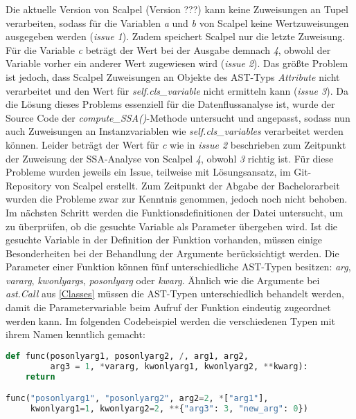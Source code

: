 \documentclass[german,bachelor]{swsLeipzig}
\begin{document}
Die aktuelle Version von Scalpel (Version ???) kann keine Zuweisungen an Tupel verarbeiten, sodass für die Variablen \textit{a} und \textit{b}
von Scalpel keine Wertzuweisungen ausgegeben werden (\textit{issue 1}).
Zudem speichert Scalpel nur die letzte Zuweisung.
Für die Variable \textit{c} beträgt der Wert bei der Ausgabe demnach \textit{4}, obwohl der Variable vorher ein anderer
Wert zugewiesen wird (\textit{issue 2}).
Das größte Problem ist jedoch, dass Scalpel Zuweisungen an Objekte des AST-Typs \textit{Attribute} nicht verarbeitet
und den Wert für \textit{self.cls\_variable} nicht ermitteln kann (\textit{issue 3}).
Da die Lösung dieses Problems essenziell für die Datenflussanalyse ist, wurde der Source Code der \textit{compute\_SSA()}-Methode
untersucht und angepasst, sodass nun auch Zuweisungen an Instanzvariablen wie \textit{self.cls\_variables} verarbeitet werden können.
Leider beträgt der Wert für \textit{c} wie in \textit{issue 2} beschrieben zum Zeitpunkt der Zuweisung der SSA-Analyse von Scalpel \textit{4}, obwohl
\textit{3} richtig ist.
Für diese Probleme wurden jeweils ein Issue, teilweise mit Lösungsansatz, im Git-Repository von Scalpel erstellt.
Zum Zeitpunkt der Abgabe der Bachelorarbeit wurden die Probleme zwar zur Kenntnis genommen, jedoch noch nicht behoben.\\

Im nächsten Schritt werden die Funktionsdefinitionen der Datei untersucht, um zu überprüfen, ob die gesuchte Variable als
Parameter übergeben wird.
Ist die gesuchte Variable in der Definition der Funktion vorhanden, müssen einige Besonderheiten bei der Behandlung der Argumente
berücksichtigt werden.
Die Parameter einer Funktion können fünf unterschiedliche AST-Typen besitzen: \textit{arg}, \textit{vararg}, \textit{kwonlyargs},
\textit{posonlyarg} oder \textit{kwarg}.
Ähnlich wie die Argumente bei \textit{ast.Call} aus \ref{Classes} müssen die AST-Typen unterschiedlich behandelt werden, damit die Parametervariable
beim Aufruf der Funktion eindeutig zugeordnet werden kann.
Im folgenden Codebeispiel werden die verschiedenen Typen mit ihrem Namen kenntlich gemacht: \\

\begin{lstlisting}[language=Python, frame=single, basicstyle=\small]
def func(posonlyarg1, posonlyarg2, /, arg1, arg2,
         arg3 = 1, *vararg, kwonlyarg1, kwonlyarg2, **kwarg):
    return

func("posonlyarg1", "posonlyarg2", arg2=2, *["arg1"],
     kwonlyarg1=1, kwonlyarg2=2, **{"arg3": 3, "new_arg": 0})
\end{lstlisting}
\
\end{document}
